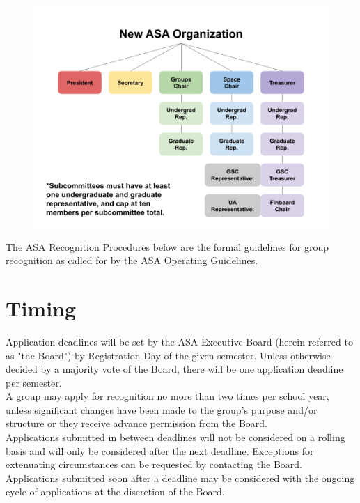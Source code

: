 \documentclass[12pt]{article}
\begin{document}
\begin{figure}[H]
    \centering
    \includegraphics[width=1\linewidth]{asa_org_chart.png}
\end{figure}

\newpage

The ASA Recognition Procedures below are the formal guidelines for group recognition as called for by
the ASA Operating Guidelines.



\section{Timing}
Application deadlines will be set by the ASA Executive Board (herein referred to as "the Board") by
Registration Day of the given semester. Unless otherwise decided by a majority vote of the Board,
there will be one application deadline per semester.
\\

A group may apply for recognition no more than two times per school year, unless significant changes
have been made to the group’s purpose and/or structure or they receive advance permission from the
Board.
\\

Applications submitted in between deadlines will not be considered on a rolling basis and will only be
considered after the next deadline. Exceptions for extenuating circumstances can be requested by
contacting the Board. Applications submitted soon after a deadline may be considered with the
ongoing cycle of applications at the discretion of the Board.
\end{document}
